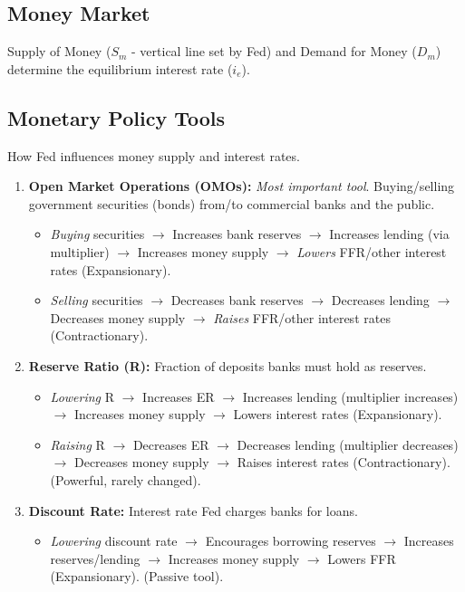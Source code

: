 \documentclass{article}
\begin{document}
\subsection*{Money Market}
Supply of Money ($S_m$ - vertical line set by Fed) and Demand for Money ($D_m$) determine the equilibrium interest rate ($i_e$).

\subsection*{Monetary Policy Tools}
How Fed influences money supply and interest rates.
\begin{enumerate}
    \item \textbf{Open Market Operations (OMOs):} \textit{Most important tool}. Buying/selling government securities (bonds) from/to commercial banks and the public.
        \begin{itemize}
            \item \textit{Buying} securities $\rightarrow$ Increases bank reserves $\rightarrow$ Increases lending (via multiplier) $\rightarrow$ Increases money supply $\rightarrow$ \textit{Lowers} FFR/other interest rates (Expansionary).
            \item \textit{Selling} securities $\rightarrow$ Decreases bank reserves $\rightarrow$ Decreases lending $\rightarrow$ Decreases money supply $\rightarrow$ \textit{Raises} FFR/other interest rates (Contractionary).
        \end{itemize}
    \item \textbf{Reserve Ratio (R):} Fraction of deposits banks must hold as reserves.
        \begin{itemize}
            \item \textit{Lowering} R $\rightarrow$ Increases ER $\rightarrow$ Increases lending (multiplier increases) $\rightarrow$ Increases money supply $\rightarrow$ Lowers interest rates (Expansionary).
            \item \textit{Raising} R $\rightarrow$ Decreases ER $\rightarrow$ Decreases lending (multiplier decreases) $\rightarrow$ Decreases money supply $\rightarrow$ Raises interest rates (Contractionary). (Powerful, rarely changed).
        \end{itemize}
    \item \textbf{Discount Rate:} Interest rate Fed charges banks for loans.
        \begin{itemize}
            \item \textit{Lowering} discount rate $\rightarrow$ Encourages borrowing reserves $\rightarrow$ Increases reserves/lending $\rightarrow$ Increases money supply $\rightarrow$ Lowers FFR (Expansionary). (Passive tool).

\end{itemize}
\end{enumerate}
\end{document}
